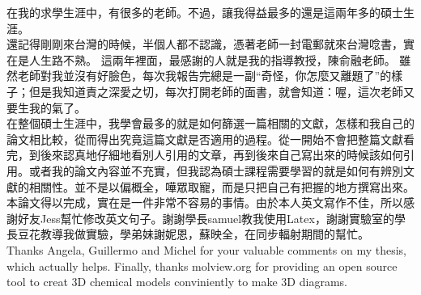 \begin{acknowledgements} 

在我的求學生涯中，有很多的老師。不過，讓我得益最多的還是這兩年多的碩士生涯。\\

還記得剛剛來台灣的時候，半個人都不認識，憑著老師一封電郵就來台灣唸書，實在是人生路不熟。 這兩年裡面，最感謝的人就是我的指導教授，陳俞融老師。 雖然老師對我並沒有好臉色，每次我報告完總是一副“奇怪，你怎麼又離題了”的樣子；但是我知道責之深愛之切，每次打開老師的面書，就會知道：喔，這次老師又要生我的氣了。\\

在整個碩士生涯中，我學會最多的就是如何篩選一篇相關的文獻，怎樣和我自己的論文相比較，從而得出究竟這篇文獻是否適用的過程。從一開始不會把整篇文獻看完，到後來認真地仔細地看別人引用的文章，再到後來自己寫出來的時候該如何引用。或者我的論文內容並不充實，但我認為碩士課程需要學習的就是如何有辨別文獻的相關性。並不是以偏概全，嘩眾取寵，而是只把自己有把握的地方撰寫出來。\\

本論文得以完成，實在是一件非常不容易的事情。由於本人英文寫作不佳，所以感謝好友Jess幫忙修改英文句子。謝謝學長samuel教我使用Latex，謝謝實驗室的學長豆花教導我做實驗，學弟妹謝妮恩，蘇映全，在同步輻射期間的幫忙。\\

Thanks Angela, Guillermo and Michel for your valuable comments on my thesis, which actually helps. Finally, thanks molview.org for providing an open source tool to creat 3D chemical models conviniently to make 3D diagrams.\\

\end{acknowledgements} 

